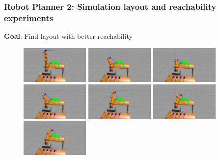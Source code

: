 \begin{frame}
\frametitle{Robot Planner 2: Simulation layout and reachability experiments}
\begin{center}
\textbf{Goal}: Find layout with better reachability
\begin{figure}[!htb]
\centering
\includegraphics[width=0.3\textwidth]{../images/robot_planner2/robot_planner2_1}
\includegraphics[width=0.3\textwidth]{../images/robot_planner2/robot_planner2_2}
\includegraphics[width=0.3\textwidth]{../images/robot_planner2/robot_planner2_3}\\
\includegraphics[width=0.3\textwidth]{../images/robot_planner2/robot_planner2_4}
\includegraphics[width=0.3\textwidth]{../images/robot_planner2/robot_planner2_5}
\includegraphics[width=0.3\textwidth]{../images/robot_planner2/robot_planner2_6}\\
\includegraphics[width=0.3\textwidth]{../images/robot_planner2/robot_planner2_7}

\end{figure}
\end{center}
\end{frame}
